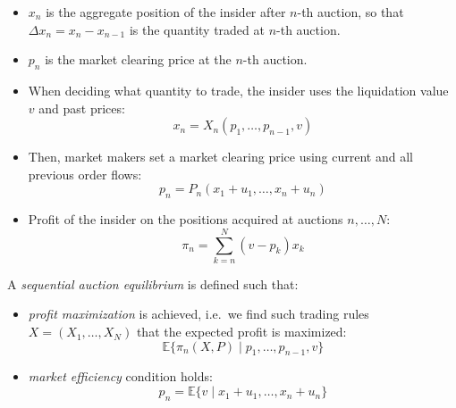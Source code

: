\documentclass{beamer}
\begin{document}
\begin{frame}
    \begin{itemize}
        \item $x_n$ is the aggregate position of the insider after $n$-th auction, so that $\Delta x_n = x_n - x_{n-1}$ is the quantity traded at $n$-th auction.
        \item $p_n$ is the market clearing price at the $n$-th auction.
        \item When deciding what quantity to trade, the insider uses the liquidation value $v$ and past prices:
            \begin{equation}
                x_n = X_n(p_1, \ldots, p_{n-1}, v)
            \end{equation}
        \item Then, market makers set a market clearing price using current and all previous order flows:
            \begin{equation}
                p_n = P_n(x_1 + u_1, \ldots, x_n + u_n)
            \end{equation}
        \item Profit of the insider on the positions acquired at auctions $n, \ldots, N$:
            \begin{equation}
                \pi_n = \sum_{k=n}^{N}(v - p_k)x_k
            \end{equation}
    \end{itemize}
\end{frame}

\begin{frame}
    A \textit{sequential auction equilibrium} is defined such that:
    \begin{itemize}
        \item \textit{profit maximization} is achieved, i.e.~we find such trading rules $X=(X_1, \ldots, X_N)$ that the expected profit is maximized:
            \begin{equation}
                \mathbb{E}\{\pi_n(X, P) \mid p_1, \ldots, p_{n-1}, v\}
            \end{equation}
        \item \textit{market efficiency} condition holds:
            \begin{equation}
                p_n = \mathbb{E}\{v \mid x_1 + 
                u_1, \ldots, x_n + u_n\}
            \end{equation}
    \end{itemize}
\end{frame}
\end{document}
